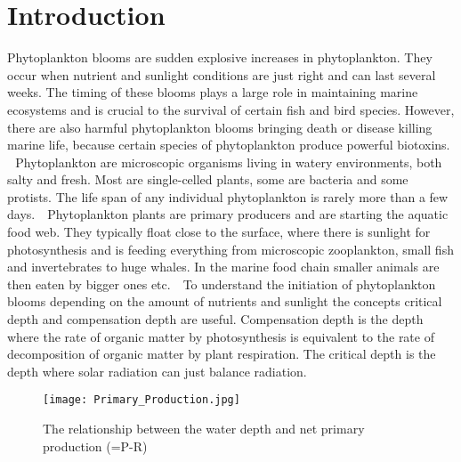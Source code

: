 \documentclass[../Main.tex]{subfiles}
\begin{document}
\section*{\crule[blue]{.3cm}{.3cm} Introduction}
Phytoplankton blooms are sudden explosive increases in phytoplankton. They occur when nutrient and sunlight conditions are just right and can last several weeks. The timing of these blooms plays a large role in maintaining marine ecosystems and is crucial to the survival of certain fish and bird species. However, there are also harmful phytoplankton blooms bringing death or disease killing marine life, because certain species of phytoplankton produce powerful biotoxins. \supercite{Prim2021} 
Phytoplankton are microscopic organisms living in watery environments, both salty and fresh. Most are single-celled plants, some are bacteria and some protists. The life span of any individual phytoplankton is rarely more than a few days. \supercite{Prim2021}  Phytoplankton plants are primary producers and are starting the aquatic food web. They typically float close to the surface, where there is sunlight for photosynthesis and is feeding everything from microscopic zooplankton, small fish and invertebrates to huge whales. In the marine food chain smaller animals are then eaten by bigger ones etc. \supercite{Prim2021}  To understand the initiation of phytoplankton blooms depending on the amount of nutrients and sunlight the concepts critical depth and compensation depth are useful. Compensation depth is the depth where the rate of organic matter by photosynthesis is equivalent to the rate of decomposition of organic matter by plant respiration. The critical depth is the depth where solar radiation can just balance radiation.\supercite{Sverdrup1953OnCF}    
\begin{figure}[H]
\texttt{[image: Primary\_Production.jpg]}
\label{fig:prim}
\caption{The relationship between the water depth and net primary production (=P-R) \supercite{Nasa2021}}
\end{figure}
\end{document}
